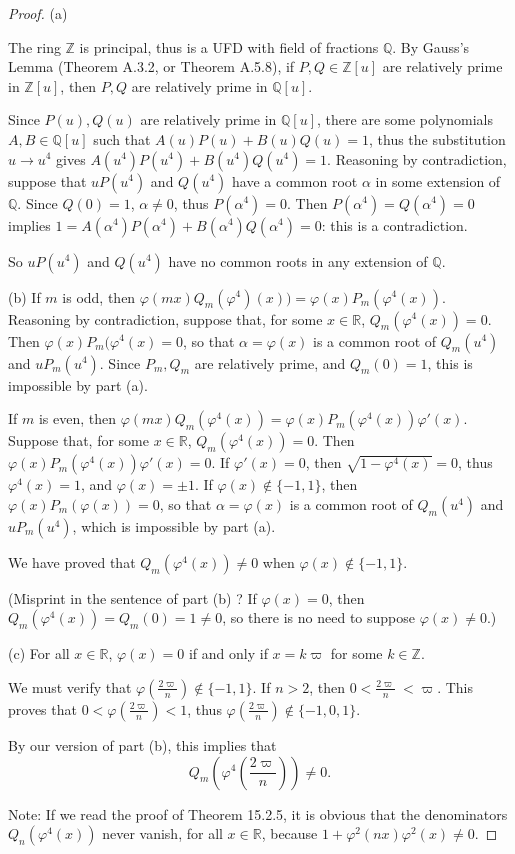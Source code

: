 \documentclass[11pt,a4paper]{article}
\newcommand{\Q}{\mathbb{Q}}
\newcommand{\Z}{\mathbb{Z}}
\newcommand{\R}{\mathbb{R}}
\begin{document}
\begin{proof} 
\item[(a)]

The ring $\Z$ is principal, thus is a UFD with field of fractions $\Q$. By Gauss's Lemma (Theorem A.3.2, or Theorem A.5.8), if $P,Q \in \Z[u]$ are relatively prime in $\Z[u]$, then $P,Q$ are relatively prime in $\Q[u]$.

Since $P(u),Q(u)$ are relatively prime in $\Q[u]$, there are some polynomials $A,B \in \Q[u]$ such that $A(u)P(u) + B(u) Q(u) = 1$, thus the substitution $u \to u^4$ gives $A(u^4) P(u^4) + B(u^4)Q(u^4) = 1$. Reasoning by contradiction, suppose that $uP(u^4)$ and $Q(u^4)$ have a common root $\alpha$ in some extension of $\Q$. Since $Q(0) = 1$, $\alpha \ne 0$, thus $P(\alpha^4) = 0$.  Then $P(\alpha^4)= Q(\alpha^4) = 0$ implies $1 = A(\alpha^4) P(\alpha^4) + B(\alpha^4)Q(\alpha^4) = 0$: this is a contradiction. 

So $uP(u^4)$ and $Q(u^4)$ have no common roots in any extension of $\Q$.

\item[(b)] If $m$ is odd, then $\varphi(mx) Q_m(\varphi^4)(x)) = \varphi(x) P_m(\varphi^4(x))$. Reasoning by contradiction, suppose that, for some $x \in \R$, $Q_m(\varphi^4(x)) = 0$. Then $\varphi(x) P_m(\varphi^4(x) = 0$, so that $\alpha = \varphi(x)$ is a common root of $Q_m(u^4)$ and $uP_m(u^4)$. Since $P_m,Q_m$ are relatively prime, and $Q_m(0) = 1$, this is impossible by part (a).

If $m$ is even, then $\varphi(mx) Q_m(\varphi^4(x)) = \varphi(x) P_m(\varphi^4(x)) \varphi'(x)$. Suppose that, for some $x \in \R$, $Q_m(\varphi^4(x)) = 0$. Then $\varphi(x) P_m(\varphi^4(x) ) \varphi'(x)= 0$. If $\varphi'(x) =0$, then $\sqrt{1 - \varphi^4(x)} = 0$, thus $\varphi^4(x) = 1$, and $\varphi(x) = \pm 1$. If $\varphi(x) \not \in \{-1,1\}$, then $\varphi(x) P_m(\varphi(x)) =0$, so that $\alpha = \varphi(x)$ is a common root of $Q_m(u^4)$ and $uP_m(u^4)$, which is impossible by part (a).

We have proved that $Q_m(\varphi^4(x)) \ne 0$ when $\varphi(x)\not \in \{-1,1\}$.

(Misprint in the sentence of part (b) ? If $\varphi(x) = 0$, then $Q_m(\varphi^4(x)) = Q_m(0) = 1 \ne 0$, so there is no need to suppose $\varphi(x) \ne 0$.)
\item[(c)] For all $x \in \R$, $\varphi(x) = 0 $ if and only if $x = k \varpi$ for some $k \in \Z$.

We must verify that $\varphi\left(\frac{2\varpi}{n}\right) \not \in \{-1,1\}$. If $n>2$, then $0<\frac{2\varpi}{n}\ < \varpi$. This proves that $0 < \varphi\left(\frac{2\varpi}{n}\right) <1$, thus $\varphi\left(\frac{2\varpi}{n}\right) \not \in \{-1,0,1\}$.

By our version of part (b), this implies that $$Q_m\left(\varphi^4\left(\frac{2\varpi}{n}\right)\right) \ne 0.$$

Note: If we read the proof of Theorem 15.2.5, it is obvious that the denominators $Q_n(\varphi^4(x))$ never vanish, for all $x \in \R$, because $1 + \varphi^2(nx) \varphi^2(x) \ne 0$.
\end{proof}
\end{document}
